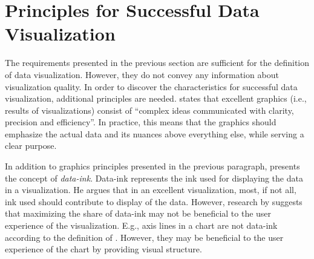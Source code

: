 \section{Principles for Successful Data Visualization}
\label{section:visualizationprinciples}

The requirements presented in the previous section are sufficient for the definition of data visualization. However, they do not convey any information about visualization quality. In order to discover the characteristics for successful data visualization, additional principles are needed. \citet[p.~13]{tufte_visual_1986} states that excellent graphics (i.e., results of visualizations) consist of ``complex ideas communicated with clarity, precision and efficiency''. In practice, this means that the graphics should emphasize the actual data and its nuances above everything else, while serving a clear purpose. 

In addition to graphics principles presented in the previous paragraph, \citet[p.~93]{tufte_visual_1986} presents the concept of \emph{data-ink}. Data-ink represents the ink used for displaying the data in a visualization. He argues that in an excellent visualization, most, if not all, ink used should contribute to display of the data. However, research by \citet{inbar_minimalism_2007} suggests that maximizing the share of data-ink may not be beneficial to the user experience of the visualization. E.g., axis lines in a chart are not data-ink according to the definition of \citeauthor{tufte_visual_1986}. However, they may be beneficial to the user experience of the chart by providing visual structure.

